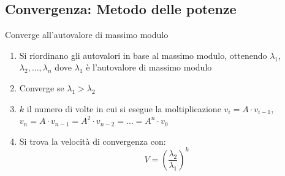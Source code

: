 \documentclass[10pt]{article}
\begin{document}
\subsection{Convergenza: Metodo delle potenze}
Converge all'autovalore di massimo modulo
\begin{enumerate}
    \item Si riordinano gli autovalori in base al massimo modulo, ottenendo $\lambda_{1}$, $\lambda_{2}, \ldots, \lambda_{n}$ dove $\lambda_{1}$ è l'autovalore di massimo modulo
    \item Converge se $\lambda_{1}>\lambda_{2}$
    \item $k$ il numero di volte in cui si esegue la moltiplicazione $v_{i} = A\cdot v_{i-1}$, $v_{n}=A\cdot v_{n-1}=A^{2}\cdot v_{n-2} = \ldots = A^{n}\cdot v_{0}$
    \item Si trova la velocità di convergenza con: \begin{equation*}
        V=\left(\frac{\lambda_{2}}{\lambda_{1}}\right)^{k}
    \end{equation*}
\end{enumerate} 
\end{document}
